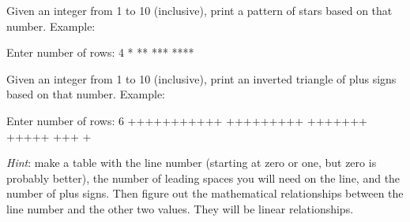 \begin{exercise}
Given an integer from 1 to 10 (inclusive), print a pattern of stars based on that number. Example:

\begin{stdout}
Enter number of rows: 4
*
**
***
****
\end{stdout}
\end{exercise}

\begin{exercise}
Given an integer from 1 to 10 (inclusive), print an inverted triangle of plus signs based on that number. Example:

\begin{stdout}
Enter number of rows: 6
+++++++++++
 +++++++++
  +++++++
   +++++
    +++
     +
\end{stdout}

{\em Hint}: make a table with the line number (starting at zero or one, but zero is probably better), the number of leading spaces you will need on the line, and the number of plus signs. Then figure out the mathematical relationships between the line number and the other two values. They will be linear relationships.
\end{exercise}
